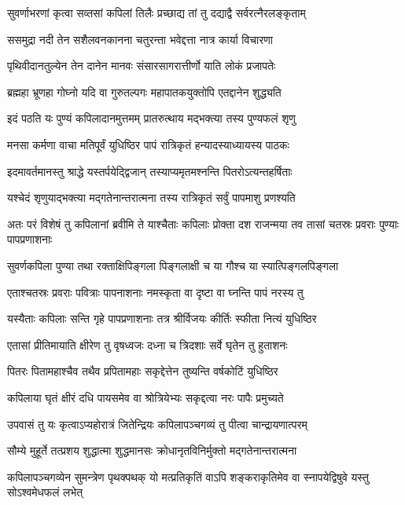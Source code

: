 \twolineshloka
{सुवर्णाभरणां कृत्वा सव्तसां कपिलां तिलैः}
{प्रच्छाद्य तां तु दद्याद्वै सर्वरत्नैरलङ्कृताम्}


\twolineshloka
{ससमुद्रा नदी तेन सशैलवनकानना}
{चतुरन्ता भवेद्दत्ता नात्र कार्या विचारणा}


\twolineshloka
{पृथिवीदानतुल्येन तेन दानेन मानवः}
{संसारसागरात्तीर्णो याति लोकं प्रजापतेः}


\twolineshloka
{ब्रह्महा भ्रूणहा गोघ्नो यदि वा गुरुतल्पगः}
{महापातकयुक्तोपि एतद्दानेन शुद्ध्यति}


\twolineshloka
{इदं पठति यः पुण्यं कपिलादानमुत्तमम्}
{प्रातरुत्थाय मद्भक्त्या तस्य पुण्यफलं शृणु}


\twolineshloka
{मनसा कर्मणा वाचा मतिपूर्वं युधिष्ठिर}
{पापं रात्रिकृतं हन्यादस्याध्यायस्य पाठकः}


\twolineshloka
{इदमावर्तमानस्तु श्राद्धे यस्तर्पयेद्द्विजान्}
{तस्याप्यमृतमश्नन्ति पितरोऽत्यन्तहर्षिताः}


\twolineshloka
{यश्चेदं शृणुयाद्भक्त्या मद्गतेनान्तरात्मना}
{तस्य रात्रिकृतं सर्वुं पापमाशु प्रणश्यति}


\threelineshloka
{अतः परं विशेषं तु कपिलानां ब्रवीमि ते}
{याश्चैताः कपिलाः प्रोक्ता दश राजन्मया तव}
{तासां चतस्रः प्रवराः पुण्याः पापप्रणाशनाः}


\twolineshloka
{सुवर्णकपिला पुण्या तथा रक्ताक्षिपिङ्गला}
{पिङ्गलाक्षी च या गौश्च या स्यात्पिङ्गलपिङ्गला}


\twolineshloka
{एताश्चतस्रः प्रवराः पवित्राः पापनाशनाः}
{नमस्कृता वा दृष्टा वा घ्नन्ति पापं नरस्य तु}


\twolineshloka
{यस्यैताः कपिलाः सन्ति गृहे पापप्रणाशनाः}
{तत्र श्रीर्विजयः कीर्तिः स्फीता नित्यं युधिष्ठिर}


\twolineshloka
{एतासां प्रीतिमायाति क्षीरेण तु वृषध्वजः}
{दध्ना च त्रिदशाः सर्वे घृतेन तु हुताशनः}


\twolineshloka
{पितरः पितामहाश्चैव तथैव प्रपितामहाः}
{सकृद्देत्तेन तुष्यन्ति वर्षकोटिं युधिष्ठिर}


\twolineshloka
{कपिलाया घृतं क्षीरं दधि पायसमेव वा}
{श्रोत्रियेभ्यः सकृद्दत्वा नरः पापैः प्रमुच्यते}


\twolineshloka
{उपवासं तु यः कृत्वाऽप्यहोरात्रं जितेन्द्रियः}
{कपिलापञ्चगव्यं तु पीत्वा चान्द्रायणात्परम्}


\twolineshloka
{सौम्ये मुहूर्ते तत्प्रशय शुद्धात्मा शुद्धमानसः}
{क्रोधानृतविनिर्मुक्तो मद्गतेनान्तरात्मना}


\threelineshloka
{कपिलापञ्चगव्येन सुमन्त्रेण पृथक्पथक्}
{यो मत्प्रतिकृतिं वाऽपि शङ्कराकृतिमेव वा}
{स्नापयेद्विषुवे यस्तु सोऽश्वमेधफलं लभेत्}


